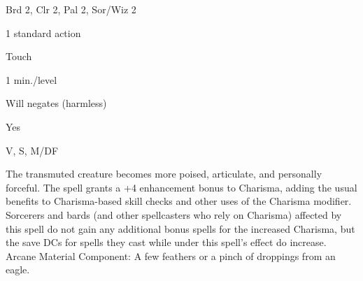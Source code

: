 
\begin{description*}
\item[Level:] Brd 2, Clr 2, Pal 2, Sor/Wiz 2
\item[Casting Time:] 1 standard action
\item[Range:] Touch
\item[Duration:] 1 min./level
\item[Saving Throw:] Will negates (harmless)
\item[Spell Resistance:] Yes
\item[Components:] V, S, M/DF
\end{description*}

The transmuted creature becomes more poised, articulate, and personally forceful.
The spell grants a +4 enhancement bonus to Charisma, adding the usual benefits
to Charisma-based skill checks and other uses of the Charisma modifier. Sorcerers
and bards (and other spellcasters who rely on Charisma) affected by this spell
do not gain any additional bonus spells for the increased Charisma, but the save
DCs for spells they cast while under this spell's effect do increase.
Arcane Material Component: A few feathers or a pinch of droppings from
an eagle.